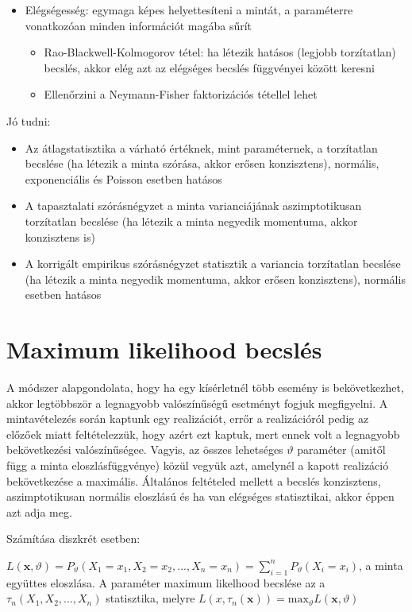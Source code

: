 \begin{itemize}
\item Elégségesség: egymaga képes helyettesíteni a mintát, a paraméterre vonatkozóan minden információt magába sűrít
	\begin{itemize}
	\item Rao-Blackwell-Kolmogorov tétel: ha létezik hatásos (legjobb torzítatlan) becslés, akkor elég azt az elégséges becslés függvényei között keresni
	\item Ellenőrzini a Neymann-Fisher faktorizációs tétellel lehet
	\end{itemize}
\end{itemize}

Jó tudni:
\begin{itemize}
\item Az átlagstatisztika a várható értéknek, mint paraméternek, a torzítatlan becslése (ha létezik a minta szórása, akkor erősen konzisztens), normális, exponenciális és Poisson esetben hatásos
\item A tapasztalati szórásnégyzet a minta varianciájának aszimptotikusan torzítatlan becslése (ha létezik a minta negyedik momentuma, akkor konzisztens is)
\item A korrigált empirikus szórásnégyzet statisztik a variancia torzítatlan becslése (ha létezik a minta negyedik momentuma, akkor erősen konzisztens), normális esetben hatásos
\end{itemize}

\section{Maximum likelihood becslés}

A módszer alapgondolata, hogy ha egy kísérletnél több esemény is bekövetkezhet, akkor legtöbbször a legnagyobb valószínűségű esetményt fogjuk megfigyelni. A mintavételezés során kaptunk egy realizációt, errőr a realizációról pedig az előzőek miatt feltételezzük, hogy azért ezt kaptuk, mert ennek volt a legnagyobb bekövetkezési valószínűségee. Vagyis, az összes lehetséges $\vartheta$ paraméter (amitől függ a minta eloszlásfüggvénye) közül vegyük azt, amelynél a kapott realizáció bekövetkezése a maximális. Általános feltételed mellett a becslés konzisztens, aszimptotikusan normális eloszlású és ha van elégséges statisztikai, akkor éppen azt adja meg.

Számítása diszkrét esetben:

$
L(\mathbf{x}, \vartheta) = P_\vartheta(X_1=x_1, X_2 = x_2, ..., X_n=x_n) = \sum_{i=1}^nP_\vartheta(X_i=x_i)$, a minta együttes eloszlása. A paraméter maximum likelhood becslése az a $\tau_n(X_1,X_2, ..., X_n)$ statisztika, melyre $L(x, \tau_n(\mathbf{x})) = \text{max}_\vartheta L(\mathbf{x}, \vartheta)
$

